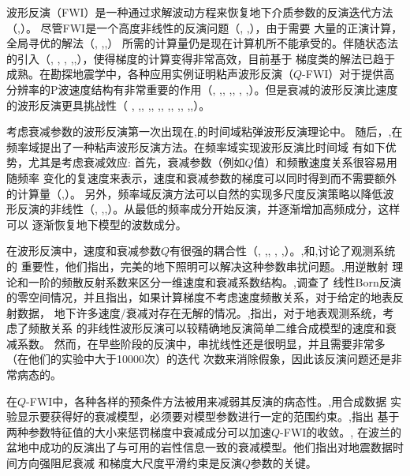 波形反演（FWI）是一种通过求解波动方程来恢复地下介质参数的反演迭代方法（,）。
尽管FWI是一个高度非线性的反演问题（, ,），由于需要
大量的正演计算，全局寻优的解法（, ,,）
所需的计算量仍是现在计算机所不能承受的。伴随状态法的引入（, ,
, ,,），使得梯度的计算变得非常高效，目前基于
梯度类的解法已趋于成熟。在勘探地震学中，各种应用实例证明粘声波形反演（$Q$-FWI）对于提供高
分辨率的P波速度结构有非常重要的作用（, ,, 
,, , ,）。但是衰减的波形反演比速度的波形反演更具挑战性（
, ,, ,, ,, 
,, ,, ,,）。

考虑衰减参数的波形反演第一次出现在,的时间域粘弹波形反演理论中。
随后，,在频率域提出了一种粘声波形反演方法。在频率域实现波形反演比时间域
有如下优势，尤其是考虑衰减效应: 首先，衰减参数（例如$Q$值）和频散速度关系很容易用随频率
变化的复速度来表示，速度和衰减参数的梯度可以同时得到而不需要额外的计算量（,）。
另外，频率域反演方法可以自然的实现多尺度反演策略以降低波形反演的非线性（, 
,,）。从最低的频率成分开始反演，并逐渐增加高频成分，这样可以
逐渐恢复地下模型的波数成分。

在波形反演中，速度和衰减参数$Q$有很强的耦合性（, ,, ,
,）。,和,讨论了观测系统的
重要性，他们指出，完美的地下照明可以解决这种参数串扰问题。,用逆散射
理论和一阶的频散反射系数来区分一维速度和衰减系数结构。,调查了
线性Born反演的零空间情况，并且指出，如果计算梯度不考虑速度频散关系，对于给定的地表反射数据，
地下许多速度/衰减对存在无解的情况。,指出，对于地表观测系统，考虑了频散关系
的非线性波形反演可以较精确地反演简单二维合成模型的速度和衰减系数。
然而，在早些阶段的反演中，串扰线性还是很明显，并且需要非常多（在他们的实验中大于10000次）的迭代
次数来消除假象，因此该反演问题还是非常病态的。

在$Q$-FWI中，各种各样的预条件方法被用来减弱其反演的病态性。,用合成数据
实验显示要获得好的衰减模型，必须要对模型参数进行一定的范围约束。,指出
基于两种参数特征值的大小来惩罚梯度中衰减成分可以加速$Q$-FWI的收敛。,
在波兰的盆地中成功的反演出了与可用的岩性信息一致的衰减模型。他们指出对地震数据时间方向强阻尼衰减
和梯度大尺度平滑约束是反演$Q$参数的关键。

